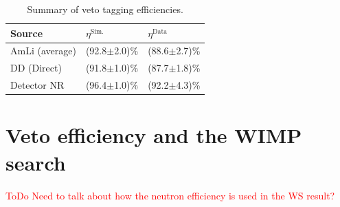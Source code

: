 \begin{table}[!ht]
	\centering
	\caption[Summary of veto tagging efficiencies.]{Summary of veto tagging efficiencies.}
	\begin{tabular}{lll}
    \hline\hline
    \textbf{Source}& \textbf{$\eta^\text{Sim.}$}& \textbf{$\eta^\text{Data}$}\\ 
    \hline
    AmLi (average) & (92.8$\pm$2.0)\% & (88.6$\pm$2.7)\% \\
    DD (Direct)    & (91.8$\pm$1.0)\% & (87.7$\pm$1.8)\% \\
    Detector NR    & (96.4$\pm$1.0)\% & (92.2$\pm$4.3)\%\\
    \hline\hline
	\end{tabular}
	\label{tab:VetoEff/final_veto_efficiency}
\end{table}


\section{Veto efficiency and the WIMP search}\label{sec:VetoEff4WIMPSearch}
\textcolor{red}{ToDo Need to talk about how the neutron efficiency is used in the WS result?}
